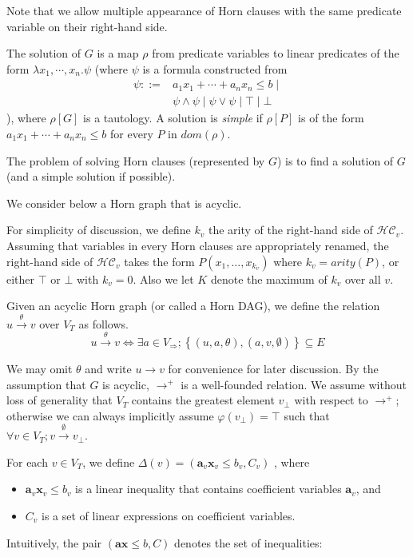 \documentclass[a4paper,12pt]{article}
\begin{document}
Note that we allow multiple appearance of Horn clauses with the same
predicate variable on their right-hand side.

The solution of $G$ is a map $\rho$ from predicate variables to linear
predicates of the form $\lambda x_1, \cdots ,x_n. \psi $ (where $\psi$
is a formula constructed from
\begin{align*}
\psi ::= & a_1 x_1 + \cdots + a_n x_n \leq b \mid \\
& \psi \wedge \psi \mid \psi \vee \psi \mid \top \mid \bot
\end{align*}
), where $\rho[G]$ is a tautology. A solution is \textit{simple} if
$\rho[P]$ is of the form $a_1 x_1 + \cdots + a_n x_n \leq b$ for every
$P$ in $dom(\rho)$.

The problem of solving Horn clauses (represented by $G$) is to find a
solution of $G$ (and a simple solution if possible).

We consider below a Horn graph that is acyclic.

For simplicity of discussion, we define $k_v$ the arity of the
right-hand side of $\mathcal{HC}_v$. Assuming that variables in every
Horn clauses are appropriately renamed, the right-hand side of
$\mathcal{HC}_v$ takes the form $P(x_1,...,x_{k_v})$ where $k_v =
arity(P)$, or either $\top$ or $\bot$ with $k_v = 0$. Also we let $K$
denote the maximum of $k_v$ over all $v$.

Given an acyclic Horn graph (or called a Horn DAG), we define the
relation $u \xrightarrow{\theta} v$ over $V_T$ as follows.
\[ u \xrightarrow{\theta} v \Longleftrightarrow
\exists a \in V_\Rightarrow; \left\lbrace (u,a,\theta), (a,v,\emptyset) \right\rbrace \subseteq E \]

We may omit $\theta$ and write $u \rightarrow v$ for convenience for
later discussion. By the assumption that $G$ is acyclic,
$\rightarrow^+$ is a well-founded relation. We assume without loss of
generality that $V_T$ contains the greatest element $v_\bot$ with
respect to $\rightarrow^+$; otherwise we can always implicitly assume
$\varphi(v_\bot) = \top$ such that $\forall v \in V_T; v
\xrightarrow{\emptyset} v_\bot$.

For each $v \in V_T$, we define
$\Delta(v) = (\mathbf{a}_v \mathbf{x}_v \leq b_v, C_v)$
, where
\begin{itemize}
\item $\mathbf{a}_v \mathbf{x}_v \leq b_v$ is a linear inequality that
  contains coefficient variables $\mathbf{a}_v$, and
\item $C_v$ is a set of linear expressions on coefficient variables.
\end{itemize}
Intuitively, the pair $(\mathbf{a} \mathbf{x} \leq b, C)$ denotes the
set of inequalities:
\end{document}
